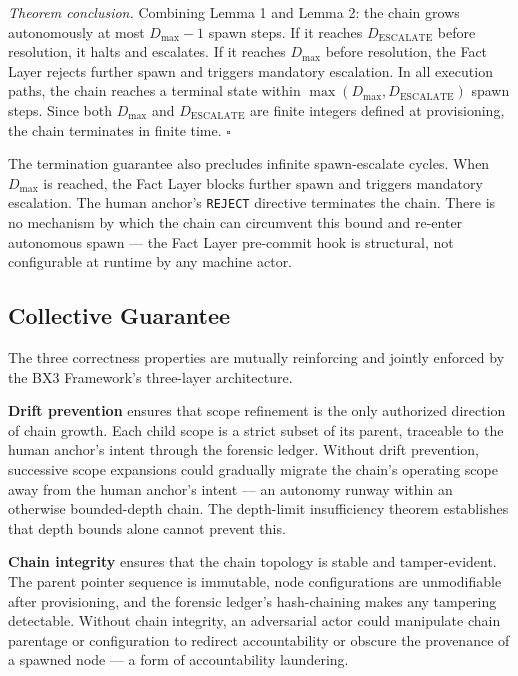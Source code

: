\medskip
\textit{Theorem conclusion.} Combining Lemma 1 and Lemma 2: the chain grows autonomously at most $D_{\mathrm{max}} - 1$ spawn steps. If it reaches $D_{\mathrm{ESCALATE}}$ before resolution, it halts and escalates. If it reaches $D_{\mathrm{max}}$ before resolution, the Fact Layer rejects further spawn and triggers mandatory escalation. In all execution paths, the chain reaches a terminal state within $\max(D_{\mathrm{max}}, D_{\mathrm{ESCALATE}})$ spawn steps. Since both $D_{\mathrm{max}}$ and $D_{\mathrm{ESCALATE}}$ are finite integers defined at provisioning, the chain terminates in finite time. $\square$

The termination guarantee also precludes infinite spawn-escalate cycles. When $D_{\mathrm{max}}$ is reached, the Fact Layer blocks further spawn and triggers mandatory escalation. The human anchor's \texttt{REJECT} directive terminates the chain. There is no mechanism by which the chain can circumvent this bound and re-enter autonomous spawn --- the Fact Layer pre-commit hook is structural, not configurable at runtime by any machine actor.

\subsection{Collective Guarantee}
\label{sec:rs-collective-guarantee}

The three correctness properties are mutually reinforcing and jointly enforced by the BX3 Framework's three-layer architecture.

\medskip
\textbf{Drift prevention} ensures that scope refinement is the only authorized direction of chain growth. Each child scope is a strict subset of its parent, traceable to the human anchor's intent through the forensic ledger. Without drift prevention, successive scope expansions could gradually migrate the chain's operating scope away from the human anchor's intent --- an autonomy runway within an otherwise bounded-depth chain. The depth-limit insufficiency theorem establishes that depth bounds alone cannot prevent this.

\medskip
\textbf{Chain integrity} ensures that the chain topology is stable and tamper-evident. The parent pointer sequence is immutable, node configurations are unmodifiable after provisioning, and the forensic ledger's hash-chaining makes any tampering detectable. Without chain integrity, an adversarial actor could manipulate chain parentage or configuration to redirect accountability or obscure the provenance of a spawned node --- a form of accountability laundering.

